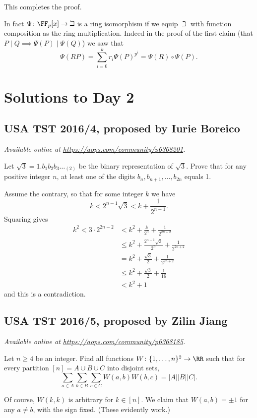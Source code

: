 \documentclass[11pt]{scrartcl}
\begin{document}
This completes the proof.

\begin{remark*}
   In fact $\Psi \colon \FF_p[x] \to \beth$
   is a ring isomorphism
   if we equip $\beth$ with function composition
   as the ring multiplication.
   Indeed in the proof of the first claim
   (that $P \mid Q \implies \Psi(P) \mid \Psi(Q)$) we saw that
   \[ \Psi(RP) = \sum_{i=0}^k r_i \Psi(P)^{p^i} = \Psi(R) \circ \Psi(P). \]
\end{remark*}
\pagebreak

\section{Solutions to Day 2}
\subsection{USA TST 2016/4, proposed by Iurie Boreico}
\textsl{Available online at \url{https://aops.com/community/p6368201}.}
\begin{mdframed}[style=mdpurplebox,frametitle={Problem statement}]
Let $\sqrt{3}=1.b_1b_2b_3\dots_{(2)}$ be the binary representation
of $\sqrt 3$. Prove that for any positive integer $n$, at least one of
the digits $b_n, b_{n+1}, \dots, b_{2n}$ equals 1.
\end{mdframed}
Assume the contrary, so that for some integer $k$ we have
\[k < 2^{n-1} \sqrt 3 < k + \frac{1}{2^{n+1}}. \]
Squaring gives
\begin{align*}
k^2 < 3 \cdot 2^{2n-2} &< k^2 + \frac{k}{2^n} + \frac{1}{2^{2n+2}} \\
&\le k^2 + \frac{2^{n-1} \sqrt 3}{2^n} + \frac{1}{2^{2n+2}} \\
&= k^2 + \frac{\sqrt3}{2} + \frac{1}{2^{2n+2}} \\
&\le k^2 + \frac{\sqrt3}{2} + \frac{1}{16} \\
&< k^2+1
\end{align*}
and this is a contradiction.
\pagebreak

\subsection{USA TST 2016/5, proposed by Zilin Jiang}
\textsl{Available online at \url{https://aops.com/community/p6368185}.}
\begin{mdframed}[style=mdpurplebox,frametitle={Problem statement}]
Let $n \ge 4$ be an integer.
Find all functions $W \colon \{1, \dots, n\}^2 \to \RR$ such that
for every partition $[n] = A \cup B \cup C$ into disjoint sets,
\[ \sum_{a \in A} \sum_{b \in B} \sum_{c \in C} W(a,b) W(b,c)
= |A| |B| |C|. \]
\end{mdframed}
Of course, $W(k,k)$ is arbitrary for $k \in [n]$.
We claim that $W(a,b) = \pm 1$ for any $a \neq b$, with the sign fixed.
(These evidently work.)
\end{document}
